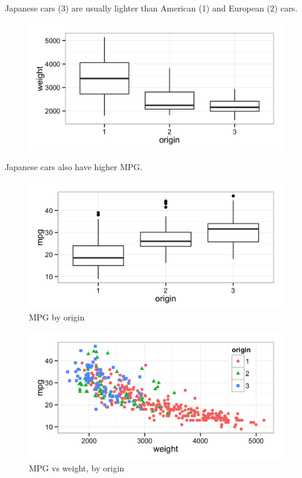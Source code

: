 \documentclass[11pt]{article}
\begin{document}
Japanese cars (3) are usually lighter than American (1) and European (2) cars.
\begin{figure}[H]
	\centering
	\includegraphics[width=5in]{9e_weight_by_origin.png}
\end{figure}


Japanese cars also have higher MPG.
\begin{figure}[H]
	\centering
	\includegraphics[width=5in]{9e_mpg_by_origin.png}
	\caption{MPG by origin}
	\label{fig:mpg_by_origin}
\end{figure}


\begin{figure}[H]
	\centering
	\includegraphics[width=5in]{9e_mpg_vs_weight_by_origin.png}
	\caption{MPG vs weight, by origin}
	\label{fig:mpg_vs_weight_by_origin}
\end{figure}
\end{document}
